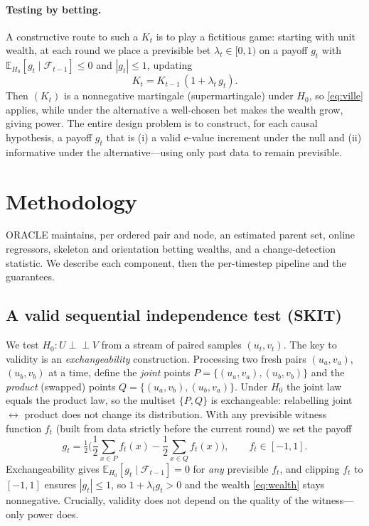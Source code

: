 \documentclass[preprint,12pt,authoryear]{elsarticle}
\begin{document}
\paragraph{Testing by betting.}
A constructive route to such a $K_t$ is to play a fictitious game: starting with
unit wealth, at each round we place a previsible bet $\lambda_t \in [0,1)$ on a
payoff $g_t$ with $\mathbb{E}_{H_0}[g_t \mid \mathcal{F}_{t-1}] \le 0$ and
$|g_t| \le 1$, updating
\begin{equation}
    K_t = K_{t-1}\,(1 + \lambda_t\, g_t).
    \label{eq:wealth}
\end{equation}
Then $(K_t)$ is a nonnegative martingale (supermartingale) under $H_0$, so
\eqref{eq:ville} applies, while under the alternative a well-chosen bet makes
the wealth grow, giving power. The entire design problem is to construct, for
each causal hypothesis, a payoff $g_t$ that is (i) a valid e-value increment
under the null and (ii) informative under the alternative---using only past data
to remain previsible.

\section{Methodology}
\label{sec:method}
ORACLE maintains, per ordered pair and node, an estimated parent set, online
regressors, skeleton and orientation betting wealths, and a change-detection
statistic. We describe each component, then the per-timestep pipeline and the
guarantees.

\subsection{A valid sequential independence test (SKIT)}
\label{sec:skit}
We test $H_0\!: U \perp\!\!\!\perp V$ from a stream of paired samples
$(u_t, v_t)$. The key to validity is an \emph{exchangeability} construction.
Processing two fresh pairs $(u_a,v_a)$, $(u_b,v_b)$ at a time, define the
\emph{joint} points $P=\{(u_a,v_a),(u_b,v_b)\}$ and the \emph{product} (swapped)
points $Q=\{(u_a,v_b),(u_b,v_a)\}$. Under $H_0$ the joint law equals the product
law, so the multiset $\{P,Q\}$ is exchangeable: relabelling joint $\leftrightarrow$
product does not change its distribution. With any previsible witness function
$f_t$ (built from data strictly before the current round) we set the payoff
\begin{equation}
    g_t = \tfrac{1}{2}\Big(\textstyle\frac{1}{2}\!\sum_{x\in P} f_t(x)
          - \frac{1}{2}\!\sum_{x\in Q} f_t(x)\Big),
    \qquad f_t \in [-1,1].
    \label{eq:payoff}
\end{equation}
Exchangeability gives $\mathbb{E}_{H_0}[g_t \mid \mathcal{F}_{t-1}] = 0$ for
\emph{any} previsible $f_t$, and clipping $f_t$ to $[-1,1]$ ensures
$|g_t|\le 1$, so $1+\lambda_t g_t > 0$ and the wealth \eqref{eq:wealth} stays
nonnegative. Crucially, validity does not depend on the quality of the
witness---only power does.
\end{document}
